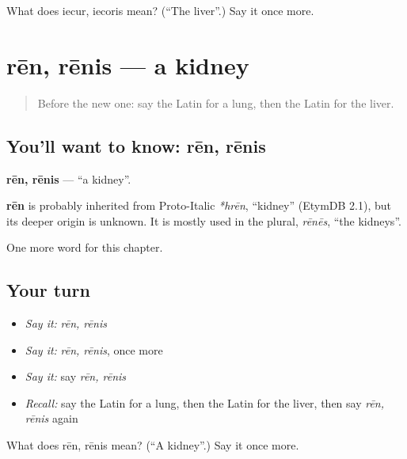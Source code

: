 \begin{tcolorbox}[breakable,colback=teal!4,colframe=teal!35!black,title={Before you move on}]
What does iecur, iecoris mean? (\textquotedblleft{}The liver\textquotedblright{}.) Say it once more.
\end{tcolorbox}
\section[rēn, rēnis]{rēn, rēnis — a kidney}

\label{lesson:LA-C173-ren}



\begin{quote}
Before the new one: say the Latin for a lung, then the Latin for the liver.
\end{quote}

\subsection*{You'll want to know: rēn, rēnis}
\textbf{rēn, rēnis} — \textquotedblleft{}a kidney\textquotedblright{}.

\begin{cousinweb}
\textbf{rēn} is probably inherited from Proto-Italic \emph{*hrēn}, \textquotedblleft{}kidney\textquotedblright{} (EtymDB 2.1), but its deeper origin is unknown. It is mostly used in the plural, \emph{rēnēs}, \textquotedblleft{}the kidneys\textquotedblright{}.
\end{cousinweb}

\begin{grammarlens}[title={What you've built}]
One more word for this chapter.
\end{grammarlens}

\subsection*{Your turn}
\begin{itemize}
\raggedright
  \item \emph{Say it:} \emph{rēn, rēnis}
  \item \emph{Say it:} \emph{rēn, rēnis}, once more
  \item \emph{Say it:} say \emph{rēn, rēnis}
  \item \emph{Recall:} say the Latin for a lung, then the Latin for the liver, then say \emph{rēn, rēnis} again
\end{itemize}

\begin{tcolorbox}[breakable,colback=teal!4,colframe=teal!35!black,title={Before you move on}]
What does rēn, rēnis mean? (\textquotedblleft{}A kidney\textquotedblright{}.) Say it once more.
\end{tcolorbox}

